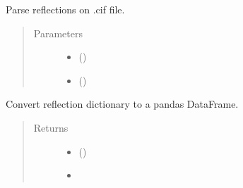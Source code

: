 \documentclass[letterpaper,10pt,english]{sphinxmanual}
\begin{document}
\begin{fulllineitems}
\begin{fulllineitems}
\label{\detokenize{usage/installation:xtalphases.data.preprocess.CIFParser.reflections_parse}}
Parse reflections on .cif file.
\begin{quote}\begin{description}
\item[{Parameters}] \leavevmode\begin{itemize}
\item {} 
 () \textendash{} 

\item {} 
 () \textendash{} 

\end{itemize}

\end{description}\end{quote}

\end{fulllineitems}


\begin{fulllineitems}
\label{\detokenize{usage/installation:xtalphases.data.preprocess.CIFParser.reflections_to_df}}
Convert reflection dictionary to a pandas DataFrame.
\begin{quote}\begin{description}
\item[{Returns}] \leavevmode
\begin{itemize}
\item {} 
 ()

\item {} 

\end{itemize}


\end{description}\end{quote}

\end{fulllineitems}


\end{fulllineitems}
\end{document}
